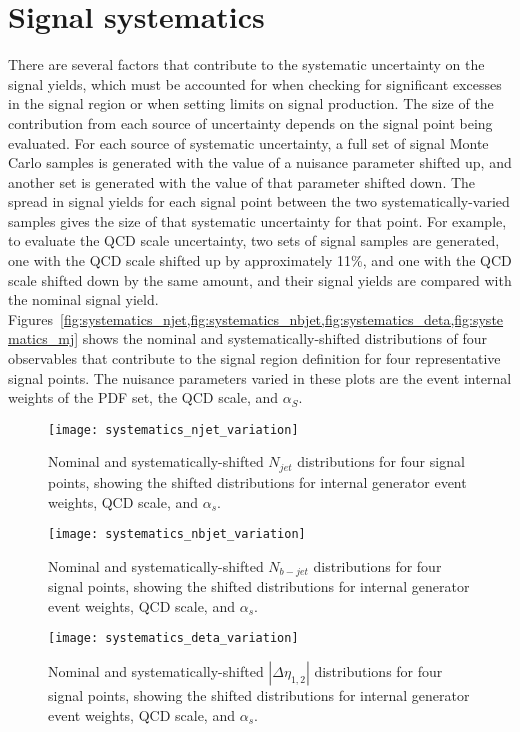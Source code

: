 \chapter{Signal systematics}\label{ch:signal_systematics}
There are several factors that contribute to the systematic uncertainty on the signal yields, which must be accounted for when checking for significant excesses in the signal region or when setting limits on signal production.
The size of the contribution from each source of uncertainty depends on the signal point being evaluated.
For each source of systematic uncertainty, a full set of signal Monte Carlo samples is generated with the value of a nuisance parameter shifted up, and another set is generated with the value of that parameter shifted down.
The spread in signal yields for each signal point between the two systematically-varied samples gives the size of that systematic uncertainty for that point.
For example, to evaluate the QCD scale uncertainty, two sets of signal samples are generated, one with the QCD scale shifted up by approximately 11\%, and one with the QCD scale shifted down by the same amount, and their signal yields are compared with the nominal signal yield.
Figures~\ref{fig:systematics_njet,fig:systematics_nbjet,fig:systematics_deta,fig:systematics_mj} shows the nominal and systematically-shifted distributions of four observables that contribute to the signal region definition for four representative signal points.
The nuisance parameters varied in these plots are the event internal weights of the PDF set, the QCD scale, and $\alpha_{S}$.

\begin{figure}[!ht]
    \centering
    \texttt{[image: systematics\_njet\_variation]}
    \caption{Nominal and systematically-shifted $N_{jet}$ distributions for four signal points, showing the shifted distributions for internal generator event weights, QCD scale, and $\alpha_{s}$.}
    \label{fig:systematics_njet}
\end{figure}

\begin{figure}[!ht]
    \centering
    \texttt{[image: systematics\_nbjet\_variation]}
    \caption{Nominal and systematically-shifted $N_{b-jet}$ distributions for four signal points, showing the shifted distributions for internal generator event weights, QCD scale, and $\alpha_{s}$.}
    \label{fig:systematics_nbjet}
\end{figure}

\begin{figure}[!ht]
    \centering
    \texttt{[image: systematics\_deta\_variation]}
    \caption{Nominal and systematically-shifted $|\Delta\eta_{1,2}|$ distributions for four signal points, showing the shifted distributions for internal generator event weights, QCD scale, and $\alpha_{s}$.}
    \label{fig:systematics_deta}
\end{figure}

